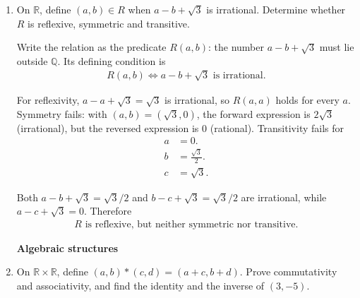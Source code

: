 \begin{enumerate}[label=\thesubsection.\arabic*, ref=\thesubsection.\theenumi]
    The following code verifies the solution.

    \begin{lstlisting}[frame=single, basicstyle=\rmfamily, escapeinside={(*@}{@*)}]
(*@\makebox[\dimexpr\linewidth-2\fboxsep-2\fboxrule\relax][c]{codes/C12/Q48.py}@*)
    \end{lstlisting}


    \item
    \label{question:C12-Q49}
    \label{question-short:C12-Q49} On $\mathbb R$, define $(a,b)\in R$ when $a-b+\sqrt3$ is irrational. Determine whether $R$ is reflexive, symmetric and transitive.

    \par
    \smallskip
    \solution

    Write the relation as the predicate $R(a,b)$: the number $a-b+\sqrt3$ must lie outside $\mathbb Q$. Its defining condition is
    \begin{align*}
        R(a,b)\Longleftrightarrow a-b+\sqrt3\text{ is irrational}.
    \end{align*}

    For reflexivity, $a-a+\sqrt3=\sqrt3$ is irrational, so $R(a,a)$ holds for every $a$. Symmetry fails: with $(a,b)=(\sqrt3,0)$, the forward expression is $2\sqrt3$ (irrational), but the reversed expression is $0$ (rational). Transitivity fails for
    \begin{align*}
        a & =0.                \\
        b & =\frac{\sqrt3}{2}. \\
        c & =\sqrt3.
    \end{align*}

    Both $a-b+\sqrt3=\sqrt3/2$ and $b-c+\sqrt3=\sqrt3/2$ are irrational, while $a-c+\sqrt3=0$. Therefore
    \begin{align*}
        R\text{ is reflexive, but neither symmetric nor transitive}.
    \end{align*}


    \par
    \medskip
    \noindent\textbf{Algebraic structures}
    \par
    \smallskip

    \item
    \label{question:C12-Q50}
    \label{question-short:C12-Q50} On $\mathbb R\times\mathbb R$, define $(a,b)*(c,d)=(a+c,b+d)$. Prove commutativity and associativity, and find the identity and the inverse of $(3,-5)$.

    \par
    \smallskip
    \solution


\end{enumerate}
